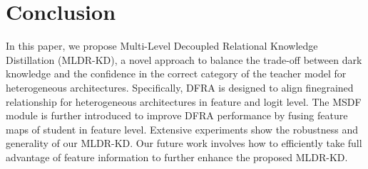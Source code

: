 \section{Conclusion}
\label{sec:conclusion}

In this paper, we propose Multi-Level Decoupled Relational Knowledge Distillation (MLDR-KD), a novel approach to balance the trade-off between dark knowledge and the confidence in the correct category of the teacher model for heterogeneous architectures. Specifically, DFRA is designed to align finegrained relationship for heterogeneous architectures in feature and logit level. The MSDF module is further introduced to improve DFRA performance by fusing feature maps of student in feature level. Extensive experiments show the robustness and generality of our MLDR-KD. Our future work involves how to efficiently take full advantage of feature information   
to further enhance the proposed MLDR-KD.






